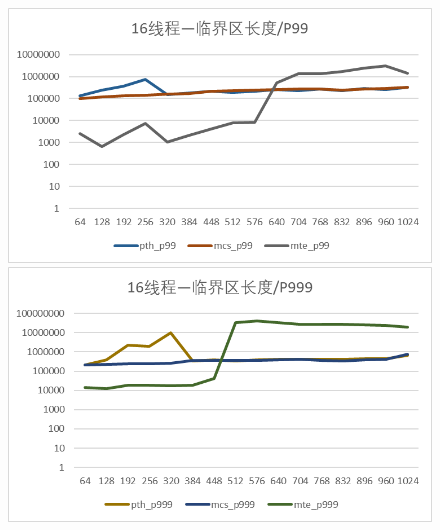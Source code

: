 \documentclass[UTF8]{ctexart}
\begin{document}
\begin{figure}[!h]
    \centering
    \begin{minipage}{0.49\linewidth}
        \centering
        \includegraphics[scale=0.64]{../images/17.png}
    \end{minipage}
    \begin{minipage}{0.49\linewidth}
        \centering
        \includegraphics[scale=0.64]{../images/18.png}
    \end{minipage}
\end{figure}
\end{document}
